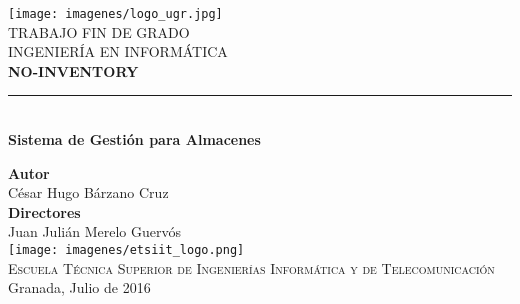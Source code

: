 \begin{titlepage}
 
 
\newlength{\centeroffset}
\setlength{\centeroffset}{-0.5\oddsidemargin}
\addtolength{\centeroffset}{0.5\evensidemargin}
\thispagestyle{empty}

\noindent\hspace*{\centeroffset}\begin{minipage}{\textwidth}

\centering
\texttt{[image: imagenes/logo\_ugr.jpg]}\\[1.4cm]

\textsc{ \Large TRABAJO FIN DE GRADO\\[0.2cm]}
\textsc{ INGENIERÍA EN INFORMÁTICA}\\[1cm]
% 
{\Huge\bfseries NO-INVENTORY\\
}
\noindent\rule[-1ex]{\textwidth}{3pt}\\[3.5ex]
{\large\bfseries Sistema de Gestión para Almacenes}

\vspace{2.5cm}

\textbf{Autor}\\ {César Hugo Bárzano Cruz}\\[2.5ex]
\textbf{Directores}\\
{Juan Julián Merelo Guervós}\\[2cm]
\texttt{[image: imagenes/etsiit\_logo.png]}\\[0.1cm]
\textsc{Escuela Técnica Superior de Ingenierías Informática y de Telecomunicación}\\
Granada, Julio de 2016

\end{minipage}


\end{titlepage}


